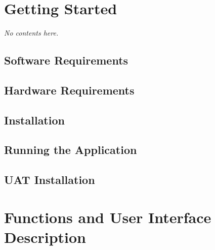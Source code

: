 \documentclass{article}
\begin{document}
\section{Getting Started}
\emph{No contents here.}

\subsection{Software Requirements}

\subsection{Hardware Requirements}

\subsection{Installation}

\subsection{Running the Application}

\subsection{UAT Installation}

\section{Functions and User Interface Description}  %
\end{document}
